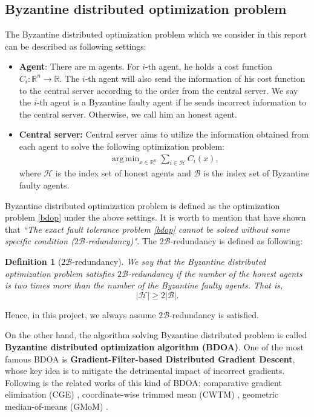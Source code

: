 \documentclass[conference]{IEEEtran}
\newtheorem{definition}{Definition}
\DeclareMathOperator*{\argmin}{arg\,min}
\begin{document}
 
\subsection{Byzantine distributed optimization problem}
The Byzantine distributed optimization problem which we consider in this report can be described as following settings:
\begin{itemize}
    \item \textbf{Agent}: There are m agents. For $i$-th agent, he holds a cost function $C_i:\mathbb{R}^n \rightarrow \mathbb{R}$. The $i$-th agent will also send the information of his cost function to the central server according to the order from the central server.  We say the $i$-th agent is a Byzantine faulty agent if he sends incorrect information to the central server. Otherwise, we call him an honest agent.
    \item \textbf{Central server:} Central server aims to utilize the information obtained from each agent to solve the following optimization problem:
    \begin{align}
    \argmin_{x\in \mathbb{R}^n} \sum_{i\in\mathcal{H}} C_i(x), \label{bdop}
    \end{align}
    where $\mathcal{H}$ is the index set of honest agents and $\mathcal{B}$ is the index set of Byzantine faulty agents.
\end{itemize}

Byzantine distributed optimization problem is defined as the optimization problem \eqref{bdop} under the above settings. It is worth to mention that \cite{su2016fault, gupta2019byzantine1, gupta2019byzantine2, liu2021approximate} have shown that 
\textit{``The exact fault tolerance problem \eqref{bdop} cannot be solved without some specific condition ($2\mathcal{B}$-redundancy)".} The $2\mathcal{B}$-redundancy is defined as following:
\begin{definition}[$2\mathcal{B}$-redundancy]\label{2bred}
We say that the Byzantine distributed optimization problem satisfies $2\mathcal{B}$-redundancy if the number of the honest agents is two times more than the number of the Byzantine faulty agents. That is, 
\begin{equation}
    |\mathcal{H}| \geq 2|\mathcal{B}|.
\end{equation}
\end{definition}
Hence, in this project, we always assume $2\mathcal{B}$-redundancy is satisfied. 

On the other hand, the algorithm solving Byzantine distributed problem is called \textbf{Byzantine distributed optimization algorithm (BDOA)}. 
One of the most famous BDOA is \textbf{Gradient-Filter-based Distributed Gradient Descent}, whose key idea is to mitigate the detrimental impact of incorrect gradients. Following is the related works of this kind of BDOA: comparative gradient elimination (CGE) \cite {gupta2020byzantine3}, coordinate-wise trimmed mean (CWTM) \cite {su2016fault}, geometric median-of-means (GMoM) \cite {chen2017distributed}.
\end{document}
